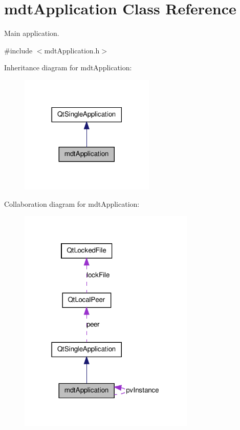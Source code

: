 \hypertarget{classmdt_application}{
\section{mdtApplication Class Reference}
\label{classmdt_application}
}


Main application.  




{\ttfamily \#include $<$mdtApplication.h$>$}



Inheritance diagram for mdtApplication:\nopagebreak
\begin{figure}[H]
\begin{center}
\leavevmode
\includegraphics[width=182pt]{classmdt_application__inherit__graph}
\end{center}
\end{figure}


Collaboration diagram for mdtApplication:\nopagebreak
\begin{figure}[H]
\begin{center}
\leavevmode
\includegraphics[width=238pt]{classmdt_application__coll__graph}
\end{center}
\end{figure}
